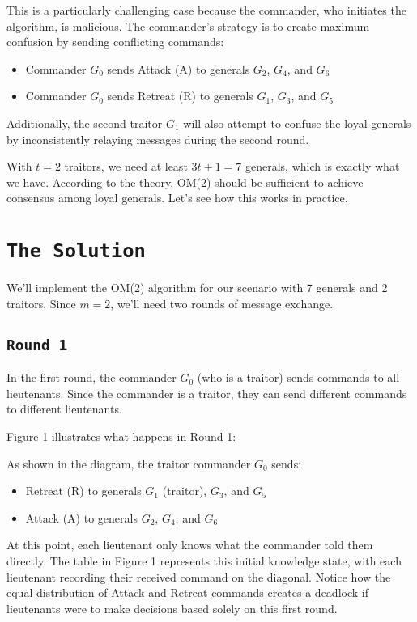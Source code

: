 \documentclass[11pt]{article}
\begin{document}
This is a particularly challenging case because the commander, who initiates the algorithm, is malicious. The commander's strategy is to create maximum confusion by sending conflicting commands:
\begin{itemize}
    \item Commander $G_0$ sends Attack (A) to generals $G_2$, $G_4$, and $G_6$
    \item Commander $G_0$ sends Retreat (R) to generals $G_1$, $G_3$, and $G_5$
\end{itemize}

Additionally, the second traitor $G_1$ will also attempt to confuse the loyal generals by inconsistently relaying messages during the second round.

With $t = 2$ traitors, we need at least $3t+1 = 7$ generals, which is exactly what we have. According to the theory, OM(2) should be sufficient to achieve consensus among loyal generals. Let's see how this works in practice.

\section*{\texttt{\Large The Solution}}
We'll implement the OM(2) algorithm for our scenario with 7 generals and 2 traitors. Since $m = 2$, we'll need two rounds of message exchange.

\subsection*{\texttt{\large Round 1}}
In the first round, the commander $G_0$ (who is a traitor) sends commands to all lieutenants. Since the commander is a traitor, they can send different commands to different lieutenants.

Figure 1 illustrates what happens in Round 1:



As shown in the diagram, the traitor commander $G_0$ sends:
\begin{itemize}
    \item Retreat (R) to generals $G_1$ (traitor), $G_3$, and $G_5$
    \item Attack (A) to generals $G_2$, $G_4$, and $G_6$
\end{itemize}

At this point, each lieutenant only knows what the commander told them directly. The table in Figure 1 represents this initial knowledge state, with each lieutenant recording their received command on the diagonal. Notice how the equal distribution of Attack and Retreat commands creates a deadlock if lieutenants were to make decisions based solely on this first round.
\end{document}
